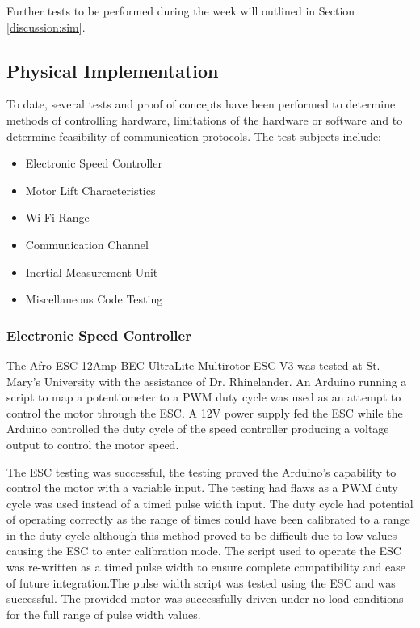 Further tests to be performed during the week will outlined in Section \ref{discussion:sim}.



\subsection{Physical Implementation}

  To date, several tests and proof of concepts have been performed to determine methods of controlling hardware, limitations of the hardware or software and to determine feasibility of communication protocols. The test subjects include:
  
\begin{itemize}
  \item{Electronic Speed Controller}
  \item{Motor Lift Characteristics}
  \item{Wi-Fi Range}
  \item{Communication Channel}
  \item{Inertial Measurement Unit}
  \item{Miscellaneous Code Testing}
 \end{itemize}

  \subsubsection{Electronic Speed Controller}
  
The Afro ESC 12Amp BEC UltraLite Multirotor ESC V3 was tested at St. Mary's University with the assistance of Dr. Rhinelander. An Arduino running a script to map a potentiometer to a PWM duty cycle was used as an attempt to control the motor through the ESC. A 12V power supply fed the ESC while the Arduino controlled the duty cycle of the speed controller producing a voltage output to control the motor speed. 

The ESC testing was successful, the testing proved the Arduino's capability to control the motor with a variable input. The testing had flaws as a PWM duty cycle was used instead of a timed pulse width input. The duty cycle had potential of operating correctly as the range of times could have been calibrated to a range in the duty cycle although this method proved to be difficult due to low values causing the ESC to enter calibration mode. The script used to operate the ESC was re-written as a timed pulse width to ensure complete compatibility and ease of future integration.The pulse width script was tested using the ESC and was successful. The provided motor was successfully driven under no load conditions for the full range of pulse width values.

